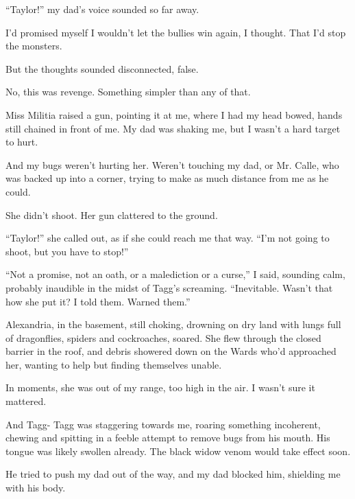 ``Taylor!'' my dad's voice sounded so far away.



I'd promised myself I wouldn't let the bullies win again, I thought.  That I'd stop the monsters.



But the thoughts sounded disconnected, false.



No, this was revenge.  Something simpler than any of that.



Miss Militia raised a gun, pointing it at me, where I had my head bowed, hands still chained in front of me.  My dad was shaking me, but I wasn't a hard target to hurt.



And my bugs weren't hurting her.  Weren't touching my dad, or Mr. Calle, who was backed up into a corner, trying to make as much distance from me as he could.



She didn't shoot.  Her gun clattered to the ground.



``Taylor!'' she called out, as if she could reach me that way.  ``I'm not going to shoot, but you have to stop!''



``Not a promise, not an oath, or a malediction or a curse,'' I said, sounding calm, probably inaudible in the midst of Tagg's screaming.  ``Inevitable.  Wasn't that how she put it?  I told them.  Warned them.''



Alexandria, in the basement, still choking, drowning on dry land with lungs full of dragonflies, spiders and cockroaches, soared.  She flew through the closed barrier in the roof, and debris showered down on the Wards who'd approached her, wanting to help but finding themselves unable.



In moments, she was out of my range, too high in the air.  I wasn't sure it mattered.



And Tagg- Tagg was staggering towards me, roaring something incoherent, chewing and spitting in a feeble attempt to remove bugs from his mouth.  His tongue was likely swollen already.  The black widow venom would take effect soon.



He tried to push my dad out of the way, and my dad blocked him, shielding me with his body.



